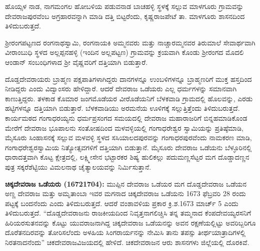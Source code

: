 ಹೊಯ್ಸಳ ನಾಡ, ನಾಗಮಂಗಲ ಹೋಬಳಿಯ ಪಡುವನಾಡ ಬಾಚಹಳ್ಳಿ ಸ್ಥಳಕ್ಕೆ ಸಲ್ಲುವ ಮಾಳಗೂರು ಗ್ರಾಮವನ್ನು ದೇವರಾಜಪುರವೆಂಬ ಅಗ್ರಹಾರವನ್ನಾಗಿ ಮಾಡಿ ದತ್ತಿ ಬಿಟ್ಟರೆಂದು, ಕೃಷ್ಣರಾಜಪೇಟೆ ತಾ. ಮಾಳಗೂರು ಶಾಸನದಿಂದ ತಿಳಿದುಬರುತ್ತದೆ.

ಶ‍್ರೀರಂಗಪಟ್ಟಣದ ರಂಗನಾಥಸ್ವಾಮಿ, ರಂಗನಾಯಕಿ ಅಮ್ಮನವರು ಮತ್ತು ನಾಚ್ಚಾರಮ್ಮನವರ ತಿರುಮಾಲೆ ಸೇವಾರ್ಥ\-ವಾಗಿ ವೀರಾಂಬುಧಿ ಸ್ಥಳದ ಅಲ್ಲಪ್ಪನಹಳ್ಳಿ (ಇಂದಿನ ಅಲ್ಲಪಟ್ಟಣ) ಗ್ರಾಮವನ್ನು ಕ್ರಯವಾಗಿ ಕೊಂಡು ಶ‍್ರೀರಂಗದ ಮೊದಲಿ ಆಂಡಾನ್​ ಸಂಬಂಧಿಗಳಾದ ಶ‍್ರೀ ವೈಷ್ಣವರಿಗೆ ದತ್ತಿಯಾಗಿ ಬಿಡುತ್ತಾರೆ.

ದೊಡ್ಡದೇವರಾಯರು ಬ್ರಾಹ್ಮಣ ಪಕ್ಷಪಾತಿಗಳಾಗಿದ್ದರು ದಾನಗಳನ್ನೂ ಉಂಬಳಿಗಳನ್ನೂ ಬ್ರಾಹ್ಮಣರಿಗೆ ಮುಕ್ತ ಹಸ್ತದಿಂದ ನೀಡಿದ್ದರು ಎಂದು ವಿದ್ವಾಂಸರು ಹೇಳಿದ್ದಾರೆ. ಆದರೆ ದೇವರಾಜ ಒಡೆಯರು ಎಲ್ಲ ಧರ್ಮಗಳನ್ನು ಸಮಾನವಾಗಿ ಕಾಣುತ್ತಿದ್ದರು. ತಳಕಾಡ ಕೊಮಾರ ಜಂಗಮೊಡೆಯರ ವೀರೊಡೆಯನಿಗೆ ಬೆಳಕವಾಡಿ ಗ್ರಾಮದಲ್ಲಿ ಹೊಲವನ್ನು, ಎರಡು ಹಟ್ಟಿಗಳನ್ನೂ ದತ್ತಿಯಾಗಿ ಬಿಡುತ್ತಾರೆ. ಬೆಳಕವಾಡಿಯು ಅರಮನೆಯ ಊಳಿಗಕ್ಕೆ ಸಲ್ಲುತ್ತಿತ್ತೆಂದು ತಿಳಿದುಬರುತ್ತದೆ. ಕಾರ್ಯಮಠದ ಗಂಗಾಧರಯ್ಯನು ಧರ್ಮಪ್ರಸಂಗದ ಸಮಯದಲ್ಲಿ ದೇವರಾಜ ಮಹಾರಾಜರಿಗೆ ಬಿನ್ನಹಮಾಡಿಕೊಂಡ ಮೇರೆಗೆ ದೇವರಾಜ ಭೂಪಾಲನು ಸಂತೋಷದಿಂದ ಮಳವಳ್ಳಿಯಲ್ಲಿ ಗಂಗಾಧರೇಶ್ವರ ಸ್ವಾಮಿಯನ್ನು ಪ್ರತಿಷ್ಠೆಮಾಡಿ, ಮೈಸೂರು ಸಿಂಹಾಸನಕ್ಕೆ ಸಲ್ಲುವ ಮಳವಳ್ಳಿ ಸ್ಥಳದ ಸಸಿಯಾಲದಪುರವನ್ನು ಗಂಗಾಧರಪುರವೆಂದು ನಾಮಕರಣ ಮಾಡಿ, ಗಂಗಾಧರೇಶ್ವರ\-ಸ್ವಾಮಿಯ ನಿತ್ಯೋತ್ಸವಗಳಿಗೆ ದತ್ತಿಯಾಗಿ ಬಿಡುತ್ತಾನೆ. ಮೈಸೂರು ದೇವರಾಜ ಒಡೆಯನು ಬೆಳ್ಳೂರಿನಲ್ಲಿ ಧಾರಾದತ್ತವಾಗಿ ಕೊಟ್ಟ ಕ್ಷೇತ್ರದಲ್ಲಿ, ಲಕ್ಷ್ಮೀಸೇನ ಭಟ್ಟಾರಕರ ಶಿಷ್ಯ ಹುಲಿಕಲ್ಲು ಪದುಮಣ್ಣಸೆಟ್ಟರ ಮಗ ದೊಡ್ಡಾದಣ್ಣನ ಪುತ್ರ ಸಕ್ಕರೆಶೆಟ್ಟಿಯು ವಿಮಲನಾಥ ಚೈತ್ಯಾಲಯವನ್ನು ನಿರ್ಮಿಸುತ್ತಾನೆ.

\textbf{ಚಿಕ್ಕದೇವರಾಜ ಒಡೆಯರು (1672\general{\enginline{-}}1704):} ಮುಪ್ಪಿನ ದೇವರಾಜ ಒಡೆಯರ ಮಗ ದೊಡ್ಡದೇವರಾಜ ಒಡೆಯನ ಅಣ್ಣ ದೇವರಾಜ ಮತ್ತು ಅಮೃತಾಂಬಾ ಇವರ ಮಗನಾದ ಚಿಕ್ಕದೇವರಾಜ ಒಡೆಯನು 1673 ಫೆಬ್ರವರಿ 28 ರಂದು ಪಟ್ಟಕ್ಕೆ ಬಂದನೆಂದು ಎಂದು ತಿಳಿದುಬರುತ್ತದೆ. ಆದರೆ ವಂಶಾವಳಿಯ ಪ್ರಕಾರ ಕ್ರಿ.ಶ.1673 ಮಾರ್ಚ್ 5 ಎಂದು ತಿಳಿದುಬರುತ್ತದೆ. “ದೊಡ್ಡದೇವರಾಜನು ರಾಜಕೀಯದಿಂದ ನಿವೃತ್ತನಾಗಲಿಚ್ಚಿಸಿ ತನ್ನ ತಮ್ಮನಾದ ಕೆಂಪದೇವಯ್ಯರಸನಿಗೆ ಹಿರಿಯರಸುತನವನ್ನು ಕೊಟ್ಟು ಯುವರಾಜನಾಗಿದ್ದ ಚಿಕ್ಕದೇವರಾಜ ಒಡೆಯನನ್ನು ಅವನ ರಕ್ಷಣೆಯಲ್ಲಿಟ್ಟು ಅವರಿಬ್ಬರಿಗೂ ದೊರೆತನದಿರವನ್ನು ತೋರಿಸಲೆಂದು ಅಳಹಿಯ ಸಿಂಗರಾರ್ಯನನ್ನು ನೇಮಿಸಿ ತಾನು ತಪಸ್ಸು ತೀರ್ಥಯಾತ್ರಾದಿಗಳಲ್ಲಿ ನಿರತನಾದನೆಂದು” ಚಿಕದೇವರಾಜವಿಜಯದಲ್ಲಿ ಹೇಳಿದೆ. ಚಿಕದೇವರಾಜನ ಆರು ಶಾಸನಗಳು ಜಿಲ್ಲೆಯಲ್ಲಿ ದೊರಕಿವೆ.

